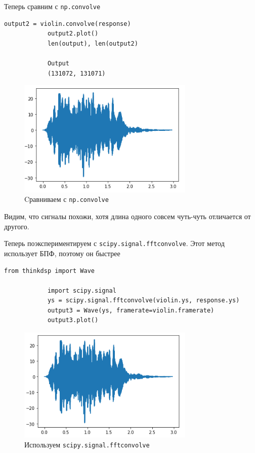 \documentclass[a4paper,12pt]{article}
\begin{document}
\begin{enumerate}
		Теперь сравним с \texttt{np.convolve}
		\begin{lstlisting}[caption=Cравниваем с \texttt{np.convolve}]
			output2 = violin.convolve(response)
			output2.plot()
			len(output), len(output2)
			
			Output
			(131072, 131071)
		\end{lstlisting}
		\begin{figure}[H]
			\centering
			\includegraphics[width=0.75\textwidth]{1_7.png}
			\caption{Cравниваем с \texttt{np.convolve}}
			\label{fig:1.7}
		\end{figure}
		
		Видим, что сигналы похожи, хотя длина одного совсем чуть-чуть отличается от другого.
		
		Теперь поэкспериментируем с \texttt{scipy.signal.fftconvolve}. Этот метод использует БПФ, поэтому он быстрее
		\begin{lstlisting}[caption=Используем \texttt{scipy.signal.fftconvolve}]
			from thinkdsp import Wave
			
			import scipy.signal
			ys = scipy.signal.fftconvolve(violin.ys, response.ys)
			output3 = Wave(ys, framerate=violin.framerate)
			output3.plot()
		\end{lstlisting}
		\begin{figure}[H]
			\centering
			\includegraphics[width=0.75\textwidth]{1_8.png}
			\caption{Используем \texttt{scipy.signal.fftconvolve}}
			\label{fig:1.8}
		\end{figure}
		

\end{enumerate}
\end{document}
